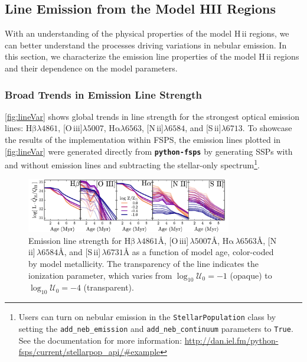 \documentclass[trackchanges, twocolumn, tighten]{aastex61}
\newcommand{\Fig}[1]{\autoref{fig:#1}}
\newcommand{\FSPS}{{\sc FSPS}\xspace}
\newcommand{\pFSPS}{{\tt \textbf{python-fsps}}\xspace}
\newcommand{\logten}{\ensuremath{\log_{10}}}
\newcommand{\nii}{[N\,{\sc ii}]\xspace}
\newcommand{\sii}{[S\,{\sc ii}]\xspace}
\newcommand{\oiii}{[O\,{\sc iii}]\xspace}
\newcommand{\ha}{\ensuremath{\mathrm{H\alpha}}}
\newcommand{\hb}{\ensuremath{\mathrm{H\beta}}}
\newcommand{\hii}{H\,{\sc ii}\xspace}
\newcommand\lam[1]{\ensuremath{\lambda #1}}
\newcommand{\ang}{\ensuremath{\mbox{\AA}}}
\newcommand{\logU}{\ensuremath{\logten \mathcal{U}_0}}
\begin{document}
\subsection{Line Emission from the Model HII Regions}\label{sec:models:lines}

With an understanding of the physical properties of the model \hii regions, we can better understand the processes driving variations in nebular emission. In this section, we characterize the emission line properties of the model \hii regions and their dependence on the model parameters. 

\subsubsection{Broad Trends in Emission Line Strength}\label{sec:models:lines:strength}

\Fig{lineVar} shows global trends in line strength for the strongest optical emission lines: \hb{}\lam{4861}, \oiii{}\lam{5007}, \ha{}\lam{6563}, \nii{}\lam{6584}, and \sii{}\lam{6713}. To showcase the results of the implementation within \FSPS, the emission lines plotted in \Fig{lineVar} were generated directly from \pFSPS by generating SSPs with and without emission lines and subtracting the stellar-only spectrum\footnote{Users can turn on nebular emission in the {\tt StellarPopulation} class by setting the {\tt add\_neb\_emission} and {\tt add\_neb\_continuum} parameters to {\tt True}. See the documentation for more information: \url{http://dan.iel.fm/python-fsps/current/stellarpop_api/\#example} }.

\begin{figure}
  \begin{centering}
    \includegraphics[width=0.8\textwidth]{f13.pdf}
    \caption{Emission line strength for \hb{}$\,\lambda4861\ang$, \oiii{}$\,\lambda5007\ang$, \ha{}$\,\lambda6563\ang$, \nii{}$\,\lambda6584\ang$, and \sii{}$\,\lambda6731\ang$ as a function of model age, color-coded by model metallicity. The transparency of the line indicates the ionization parameter, which varies from $\logU{}=-1$ (opaque) to $\logU{}=-4$ (transparent).}
    \label{fig:lineVar}
  \end{centering}
\end{figure}
\end{document}
